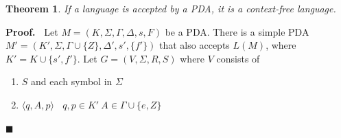 \documentclass[aps,pra,onecolumn,notitlepage,superscriptaddress]{revtex4-1}
\def\>{\rangle}
\def\<{\langle}
\newtheorem{theo}{Theorem}
\newtheorem{exa}{Example}
\def\Proof{{\bf Proof.~}}
\def\qed{$\blacksquare$ \newline}
\begin{document}
    \begin{theo}
        If a language is accepted by a PDA, it is a context-free language.
    \end{theo}
    \Proof
    Let $M = (K,\Sigma,\Gamma,\Delta,s,F)$ be a PDA. 
    There is a simple PDA $M' = (K', \Sigma, \Gamma \cup \{Z\}, \Delta', s', \{f'\})$ that also accepts $L(M)$, where $K' = K \cup \{ s', f' \}$. Let $G = (V,\Sigma,R,S)$ where $V$ consists of
    \begin{enumerate}
        \item $S$ and each symbol in $\Sigma$
        \item $\< q,A,p \> \ \ \ \ q,p \in K' \ A \in \Gamma \cup \{ e,Z \}$
    \end{enumerate}
    \qed

\end{document}
